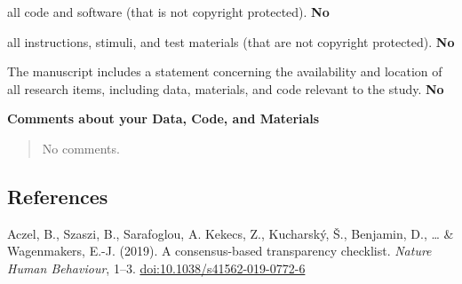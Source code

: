 \documentclass[
  ,
]{article}
\begin{document}
all code and software (that is not copyright protected).
\hfill  \textbf{No}

all instructions, stimuli, and test materials (that are not copyright
protected). \hfill  \textbf{No}

The manuscript includes a statement concerning the availability and
location of all research items, including data, materials, and code
relevant to the study. \hfill  \textbf{No}

\textbf{Comments about your Data, Code, and Materials}

\begin{quote}
No comments.
\end{quote}

\newpage

\hypertarget{references}{%
\subsection{References}\label{references}}

Aczel, B., Szaszi, B., Sarafoglou, A. Kekecs, Z., Kucharský, Š.,
Benjamin, D., \ldots{} \& Wagenmakers, E.-J. (2019). A consensus-based
transparency checklist. \emph{Nature Human Behaviour}, 1--3.
\url{doi:10.1038/s41562-019-0772-6}
\end{document}
